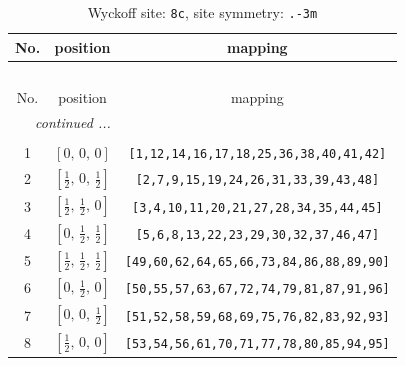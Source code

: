 \documentclass[fleqn,8pt]{jsarticle}
\begin{document}
\begin{longtable}{ccc}
\caption{Wyckoff site: {\tt 8c}, site symmetry: {\tt .-3m}}
 \\
 \hline \hline
No. & position & mapping \\ \hline \endfirsthead

\multicolumn{2}{l}{\tablename\ \thetable{}} \\
 \hline \hline
No. & position & mapping \\ \hline \endhead

 \hline \hline
\multicolumn{2}{r}{\footnotesize\it continued ...} \\ \endfoot

 \hline \hline
\multicolumn{2}{r}{} \\ \endlastfoot

1 & $\left[ 0,\, 0,\, 0 \right]$ & {\tt [1,12,14,16,17,18,25,36,38,40,41,42]} \\ \hline
2 & $\left[ \frac{1}{2},\, 0,\, \frac{1}{2} \right]$ & {\tt [2,7,9,15,19,24,26,31,33,39,43,48]} \\ \hline
3 & $\left[ \frac{1}{2},\, \frac{1}{2},\, 0 \right]$ & {\tt [3,4,10,11,20,21,27,28,34,35,44,45]} \\ \hline
4 & $\left[ 0,\, \frac{1}{2},\, \frac{1}{2} \right]$ & {\tt [5,6,8,13,22,23,29,30,32,37,46,47]} \\ \hline
5 & $\left[ \frac{1}{2},\, \frac{1}{2},\, \frac{1}{2} \right]$ & {\tt [49,60,62,64,65,66,73,84,86,88,89,90]} \\ \hline
6 & $\left[ 0,\, \frac{1}{2},\, 0 \right]$ & {\tt [50,55,57,63,67,72,74,79,81,87,91,96]} \\ \hline
7 & $\left[ 0,\, 0,\, \frac{1}{2} \right]$ & {\tt [51,52,58,59,68,69,75,76,82,83,92,93]} \\ \hline
8 & $\left[ \frac{1}{2},\, 0,\, 0 \right]$ & {\tt [53,54,56,61,70,71,77,78,80,85,94,95]} \\
\end{longtable}
\renewcommand{\arraystretch}{1.2}
\end{document}
